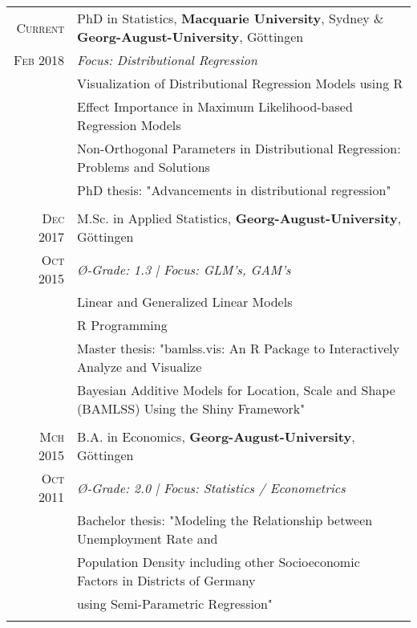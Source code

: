 \documentclass[a4paper,10pt]{article} %
\begin{document}
\begin{tabular}{rl}
\textsc{Current} & PhD in Statistics, \textbf{Macquarie University}, Sydney \& \textbf{Georg-August-University}, Göttingen\\
\textsc{Feb 2018}& \emph{Focus: Distributional Regression}\\
& \footnotesize{Visualization of Distributional Regression Models using R} \\
& \footnotesize{Effect Importance in Maximum Likelihood-based Regression Models} \\
& \footnotesize{Non-Orthogonal Parameters in Distributional Regression: Problems and Solutions} \\
& \footnotesize{PhD thesis: "Advancements in distributional regression"} \\
&\\





\textsc{Dec 2017}& M.Sc. in Applied Statistics, \textbf{Georg-August-University}, Göttingen\\
\textsc{Oct 2015}& \emph{{{\O}}-Grade: 1.3 | Focus: GLM's, GAM's}\\
& \footnotesize{Linear and Generalized Linear Models} \\
& \footnotesize{R Programming} \\
& \footnotesize{Master thesis: "bamlss.vis: An R Package to Interactively Analyze and Visualize} \\
& \footnotesize{Bayesian Additive Models for Location, Scale and Shape (BAMLSS) Using the Shiny Framework"} \\
&\\




\textsc{Mch 2015}& B.A. in Economics, \textbf{Georg-August-University}, Göttingen\\
\textsc{Oct 2011}& \emph{{{\O}}-Grade: 2.0 | Focus: Statistics / Econometrics}\\
&\footnotesize{Bachelor thesis: "Modeling the Relationship between
Unemployment Rate and}\\
&\footnotesize{Population Density including other
Socioeconomic Factors in Districts of
Germany}\\
& \footnotesize{using Semi-Parametric Regression"} \\
&\\


\end{tabular}
\end{document}
